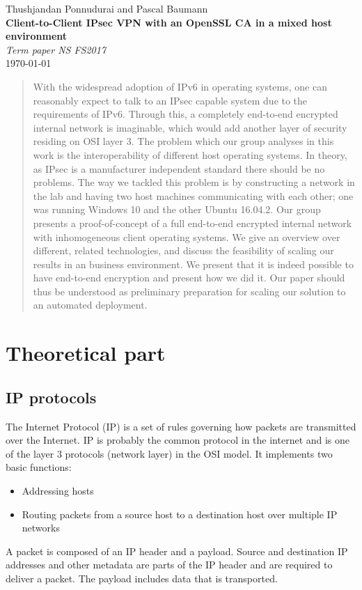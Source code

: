 \documentclass[a4paper]{report}
\newcommand*{\titleAP}{\begingroup %
	\centering
	\vspace*{\baselineskip} %
	
	{\Large Thushjandan Ponnudurai} and {\Large Pascal Baumann}\\[0.167\textheight] %
	
	{\Huge\bfseries Client-to-Client IPsec VPN with an OpenSSL CA in a mixed host environment}\\[\baselineskip]
	
	{\Large \textit{Term paper NS FS2017}}\\
	\today
	
	\vspace*{3\baselineskip} %
	\endgroup}
\begin{document}
\titleAP

\newpage

\begin{abstract}
	With the widespread adoption of IPv6 in operating systems, one can reasonably expect to talk to an IPsec capable system due to the requirements of IPv6. Through this, a completely end-to-end encrypted internal network is imaginable, which would add another layer of security residing on OSI layer 3.
	The problem which our group analyses in this work is the interoperability of different host operating systems. In theory, as IPsec is a manufacturer independent standard there should be no problems.
	The way we tackled this problem is by constructing a network in the lab and having two host machines communicating with each other; one was running Windows 10 and the other Ubuntu 16.04.2.
	Our group presents a proof-of-concept of a full end-to-end encrypted internal network with inhomogeneous client operating systems. We give an overview over different, related technologies, and discuss the feasibility of scaling our results in an business environment.
	We present that it is indeed possible to have end-to-end encryption and present how we did it. Our paper should thus be understood as preliminary preparation for scaling our solution to an automated deployment.
\end{abstract}

\tableofcontents

\newpage

\chapter{Theoretical part}
\label{ch:Theory}

\section{IP protocols}
\label{sec:IPprot}
The Internet Protocol (IP) is a set of rules governing how packets are transmitted over the Internet. IP is probably the common protocol in the internet and is one of the layer 3 protocols (network layer) in the OSI model. It implements two basic functions:
\begin{itemize}
	\item Addressing hosts
	\item Routing packets from a source host to a destination host over multiple IP networks
\end{itemize}
A packet is composed of an IP header and a payload. Source and destination IP addresses and other metadata are parts of the IP header and are required to deliver a packet. The payload includes data that is transported. 
\end{document}
